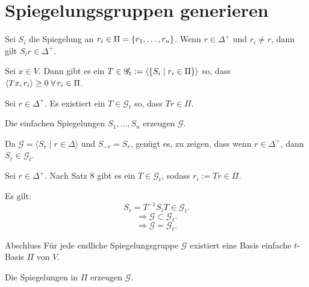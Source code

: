 \documentclass[18pt]{beamer}
\begin{document}
\section{Spiegelungsgruppen generieren}
\begin{frame}
    \begin{satz} %
        Sei \( S_i \) die Spiegelung an 
        \( r_i \in \Pi = \{r_1, \ldots, r_n\} \).
        Wenn \( r \in \Delta^+ \) und \( r_i \neq r \), 
        dann gilt \( S_i r \in \Delta^+ \).
    \end{satz}
    \pause
    \begin{satz} %
        Sei \( x \in V\). Dann gibt es ein \( T \in 
        \mathscr{G}_t := \langle 
        \{S_i \;\vert\; r_i \in \Pi\} \rangle \) so, dass
        \( \scalarprod{Tx}{r_i} \geq 0 \;\forall r_i \in \Pi \).
    \end{satz}
\end{frame}

\begin{frame}
    \begin{satz} %
        Sei \( r \in \Delta^+ \). Es existiert ein \( T \in 
        \mathscr{G}_t \) so, dass 
        \( Tr \in \Pi \).
    \end{satz}
\end{frame}

\begin{frame}
    \begin{satz} %
        Die einfachen Spiegelungen \( S_1, \ldots, S_n \) 
        erzeugen \( \mathscr{G} \).
    \end{satz}
    \pause
    \begin{bew}
        Da \( \mathscr{G} = \langle S_r \;\vert\; r \in \Delta \rangle \) 
        und \( S_{-r} = S_r \), genügt es, zu zeigen, dass wenn 
        \( r\in \Delta^+ \), dann \( S_r \in \mathscr{G}_t \).

        \pause
        Sei \( r \in \Delta^+ \). Nach Satz 8 gibt es 
        ein \( T \in \mathscr{G}_t \), sodass 
        \( r_i := Tr \in \Pi \).

        \pause
        Es gilt:
        \[ S_r = T^{-1} S_i T \in \mathscr{G}_t. \]
        \[ \Rightarrow \mathscr{G} \subset \mathscr{G}_t. \]
        \[ \Rightarrow \mathscr{G} = \mathscr{G}_t. \]
    \end{bew}
\end{frame}

\begin{frame}{Abschluss}
    Für jede endliche Spiegelungsgruppe 
    \( \mathscr{G} \) existiert eine Basis 
    einfache \( t \)-Basis \( \Pi \) 
    von \( V \). 
    \pause
    
    Die Spiegelungen in 
    \( \Pi \) erzeugen \( \mathscr{G} \).
\end{frame}
\end{document}
